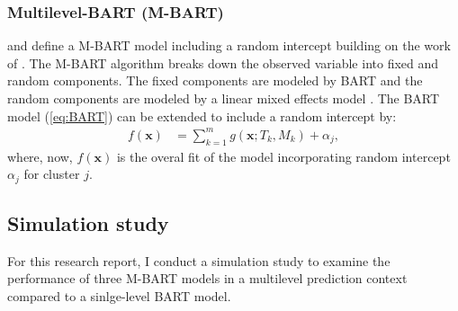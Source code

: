 \documentclass[10pt, a4paper, titlepage]{article}
\begin{document}
\subsubsection{Multilevel-BART (M-BART)}
\citet{chen2020, wagner2020} and \citet{tan2016} define a M-BART model including a random intercept building on the work of \citet{lin2019}. The M-BART algorithm breaks down the observed variable into fixed and random components. The fixed components are modeled by BART and the random components are modeled by a linear mixed effects model \citep{chen2020, wagner2020, tan2016}. The BART model (\ref{eq:BART}) can be extended to include a random intercept by:
\begin{subequations}
\label{eq:M-BART}
\begin{align}
f(\textbf{x}) &= \sum^{m}_{k=1}g(\textbf{x}; T_{k}, M_{k}) + \alpha_{j}, \tag{3}
\end{align}
\end{subequations} where, now, $f(\textbf{x})$ is the overal fit of the model incorporating random intercept $\alpha_{j}$ for cluster $j$.

\subsection{Simulation study}
For this research report, I conduct a simulation study to examine the performance of three M-BART models in a multilevel prediction context compared to a sinlge-level BART model.
\end{document}
